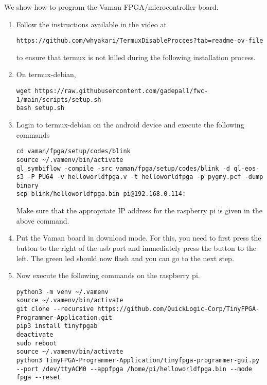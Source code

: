 We show how to program the Vaman FPGA/microcontroller board.  


%
%
\begin{enumerate}[label=\arabic*.,ref=\theenumi]
	\item Follow the instructions available in the video at
\begin{lstlisting}
https://github.com/whyakari/TermuxDisableProcces?tab=readme-ov-file
\end{lstlisting}
to ensure that termux is not killed during the following installation process.
\item On termux-debian,
\begin{lstlisting}
wget https://raw.githubusercontent.com/gadepall/fwc-1/main/scripts/setup.sh
bash setup.sh
\end{lstlisting}
%
\item Login to termux-debian on the android device and execute the following commands
\begin{lstlisting}
cd vaman/fpga/setup/codes/blink
source ~/.vamenv/bin/activate
ql_symbiflow -compile -src vaman/fpga/setup/codes/blink -d ql-eos-s3 -P PU64 -v helloworldfpga.v -t helloworldfpga -p pygmy.pcf -dump binary
scp blink/helloworldfpga.bin pi@192.168.0.114:
\end{lstlisting}
Make sure that the appropriate IP address for the raspberry pi is given in the above command.
\item Put the Vaman board in download mode.  For this, you need to first press the button to the right of the usb port and immediately press the button to the left.  The green led should now flash and you can go to the next step.  
\item Now execute the following commands on the raspberry pi.
\begin{lstlisting}
python3 -m venv ~/.vamenv
source ~/.vamenv/bin/activate
git clone --recursive https://github.com/QuickLogic-Corp/TinyFPGA-Programmer-Application.git
pip3 install tinyfpgab
deactivate
sudo reboot
source ~/.vamenv/bin/activate
python3 TinyFPGA-Programmer-Application/tinyfpga-programmer-gui.py --port /dev/ttyACM0 --appfpga /home/pi/helloworldfpga.bin --mode fpga --reset

\end{lstlisting}
\end{enumerate}
